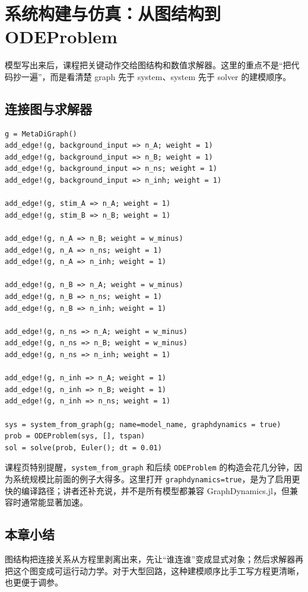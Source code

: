 \documentclass[a4paper]{article}
\begin{document}
\section{系统构建与仿真：从图结构到 ODEProblem}
模型写出来后，课程把关键动作交给图结构和数值求解器。这里的重点不是“把代码抄一遍”，而是看清楚 graph 先于 system、system 先于 solver 的建模顺序。

\subsection{连接图与求解器}
\begin{lstlisting}[caption={图结构、系统构造与数值求解},label={lst:dm_graph}]
g = MetaDiGraph()
add_edge!(g, background_input => n_A; weight = 1)
add_edge!(g, background_input => n_B; weight = 1)
add_edge!(g, background_input => n_ns; weight = 1)
add_edge!(g, background_input => n_inh; weight = 1)

add_edge!(g, stim_A => n_A; weight = 1)
add_edge!(g, stim_B => n_B; weight = 1)

add_edge!(g, n_A => n_B; weight = w_minus)
add_edge!(g, n_A => n_ns; weight = 1)
add_edge!(g, n_A => n_inh; weight = 1)

add_edge!(g, n_B => n_A; weight = w_minus)
add_edge!(g, n_B => n_ns; weight = 1)
add_edge!(g, n_B => n_inh; weight = 1)

add_edge!(g, n_ns => n_A; weight = w_minus)
add_edge!(g, n_ns => n_B; weight = w_minus)
add_edge!(g, n_ns => n_inh; weight = 1)

add_edge!(g, n_inh => n_A; weight = 1)
add_edge!(g, n_inh => n_B; weight = 1)
add_edge!(g, n_inh => n_ns; weight = 1)

sys = system_from_graph(g; name=model_name, graphdynamics = true)
prob = ODEProblem(sys, [], tspan)
sol = solve(prob, Euler(); dt = 0.01)
\end{lstlisting}

课程页特别提醒，\texttt{system\_from\_graph} 和后续 \texttt{ODEProblem} 的构造会花几分钟，因为系统规模比前面的例子大得多。这里打开 \texttt{graphdynamics=true}，是为了启用更快的编译路径；讲者还补充说，并不是所有模型都兼容 GraphDynamics.jl，但兼容时通常能显著加速。

\subsection{本章小结}
图结构把连接关系从方程里剥离出来，先让“谁连谁”变成显式对象；然后求解器再把这个图变成可运行动力学。对于大型回路，这种建模顺序比手工写方程更清晰，也更便于调参。
\end{document}
